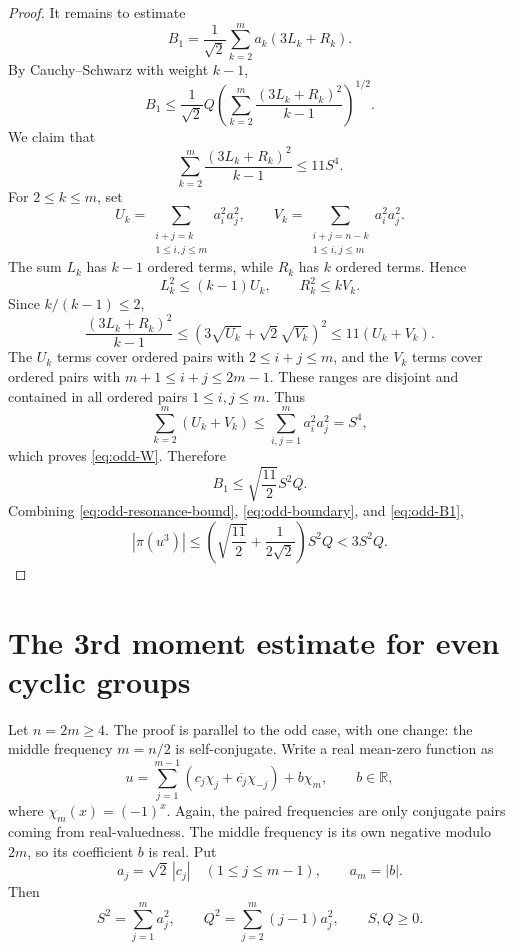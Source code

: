 \documentclass[11pt]{amsart}
\numberwithin{equation}{section}
\theoremstyle{plain}
\theoremstyle{remark}
\newcommand{\RR}{\mathbb R}
\newcommand{\ch}[1]{\chi_{#1}}
\newcommand{\coef}{c}
\newcommand{\Ssymbol}{S}
\newcommand{\Qsymbol}{Q}
\newcommand{\Ssq}{\Ssymbol^2}
\newcommand{\Qsq}{\Qsymbol^2}
\newcommand{\Sfour}{\Ssymbol^4}
\newcommand{\AvgSymbol}{\pi}
\newcommand{\Avg}[1]{\AvgSymbol\!\left(#1\right)}
\newcommand{\abs}[1]{\left|#1\right|}
\begin{document}
\begin{proof}
It remains to estimate
\[
  B_1=\frac1{\sqrt2}\sum_{k=2}^{m}a_k(3L_k+R_k).
\]
By Cauchy--Schwarz with weight \(k-1\),
\[
  B_1\le \frac1{\sqrt2}\Qsymbol\left(
  \sum_{k=2}^{m}\frac{(3L_k+R_k)^2}{k-1}
  \right)^{1/2}.
\]
We claim that
\begin{equation}\label{eq:odd-W}
  \sum_{k=2}^{m}\frac{(3L_k+R_k)^2}{k-1}
  \le 11\Sfour.
\end{equation}
For \(2\le k\le m\), set
\[
  U_k=\sum_{\substack{i+j=k\\1\le i,j\le m}}a_i^2 a_j^2,
  \qquad
  V_k=\sum_{\substack{i+j=n-k\\1\le i,j\le m}}a_i^2 a_j^2.
\]
The sum \(L_k\) has \(k-1\) ordered terms, while \(R_k\) has \(k\)
ordered terms.  Hence
\[
  L_k^2\le(k-1)U_k,
  \qquad
  R_k^2\le kV_k.
\]
Since \(k/(k-1)\le2\),
\[
  \frac{(3L_k+R_k)^2}{k-1}
  \le \left(3\sqrt{U_k}+\sqrt2\sqrt{V_k}\right)^2
  \le 11(U_k+V_k).
\]
The \(U_k\) terms cover ordered pairs with \(2\le i+j\le m\), and the
\(V_k\) terms cover ordered pairs with \(m+1\le i+j\le2m-1\).  These
ranges are disjoint and contained in all ordered pairs \(1\le i,j\le m\).
Thus
\[
  \sum_{k=2}^{m}(U_k+V_k)
  \le \sum_{i,j=1}^{m}a_i^2 a_j^2=\Sfour,
\]
which proves \eqref{eq:odd-W}.  Therefore
\begin{equation}\label{eq:odd-B1}
  B_1\le \sqrt{\frac{11}{2}}\Ssq\Qsymbol.
\end{equation}
Combining \eqref{eq:odd-resonance-bound}, \eqref{eq:odd-boundary}, and
\eqref{eq:odd-B1},
\[
  \abs{\Avg{u^3}}
  \le \left(\sqrt{\frac{11}{2}}+\frac1{2\sqrt2}\right)\Ssq\Qsymbol
  <3\Ssq\Qsymbol.
\]
\end{proof}

\section{The 3rd moment estimate for even cyclic groups}

Let \(n=2m\ge4\).  The proof is parallel to the odd case, with one
change: the middle frequency \(m=n/2\) is self-conjugate.  Write a real
mean-zero function as
\[
  u=\sum_{j=1}^{m-1}\left(\coef_j\ch{j}+\overline{\coef_j}\ch{-j}\right)
  +b\ch{m},
  \qquad b\in\RR,
\]
where \(\ch{m}(x)=(-1)^x\).  Again, the paired frequencies are only conjugate pairs coming from
real-valuedness.  The middle frequency is its own negative modulo \(2m\),
so its coefficient \(b\) is real.  Put
\[
  a_j=\sqrt2\,\abs{\coef_j}\quad (1\le j\le m-1),
  \qquad
  a_m=\abs{b}.
\]
Then
\[
  \Ssq=\sum_{j=1}^{m}a_j^2,
  \qquad
  \Qsq=\sum_{j=2}^{m}(j-1)a_j^2,
  \qquad \Ssymbol,\Qsymbol\ge0.
\]
\end{document}
